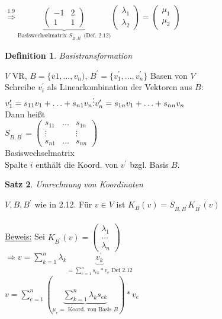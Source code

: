 \documentclass[a4paper,11pt]{article}
\newtheorem{definition}{Definition}[section]
\newtheorem{satz}[definition]{Satz}
\begin{document}
\\
$\overset{1.9}{\Rightarrow}\underbrace{\begin{pmatrix}-1&2\\1&1\end{pmatrix}}_{\text{Basiswechselmatrix }S_{B,B^\prime}\text{ (Def. 2.12)}}\begin{pmatrix}\lambda_1\\\lambda_2\end{pmatrix}=\begin{pmatrix}\mu_1\\\mu_2\end{pmatrix}$

\newpage

\begin{definition}
	Basistransformation
\end{definition}
$V$ VR, $B=\{v1,...,v_n)$, $B^\prime=\{v^\prime_1,...,v^\prime_n\}$ Basen von $V$ \\
Schreibe $v^\prime_i$ als Linearkombination der Vektoren aus $B$: \\
$v^\prime_1=s_{11}v_1+\hdots+s_{n1}v_n \\
\vdots \\
v^\prime_n=s_{1n}v_1+\hdots+s_{nn}v_n$ \\
Dann heißt \\
$S_{B,B^\prime}=\begin{pmatrix}s_{11} & \hdots & s_{1n} \\ \vdots & & \vdots \\ s_{n1} & \hdots & s_{nn}\end{pmatrix}$ \\
Basiswechselmatrix \\
Spalte $i$ enthält die Koord. von $v^\prime$ bzgl. Basis $B$.

\begin{satz}
	Umrechnung von Koordinaten
\end{satz}
$V,B,B^\prime$ wie in 2.12. Für $v\in V$ ist $K_B(v)=S_{B,B^\prime}K_{B^\prime}(v)$ \\
\\
\underline{Beweis:}
Sei $K_{B^\prime}(v)=\begin{pmatrix}\lambda_1 \\ \hdots \\ \lambda_n\end{pmatrix}$ \\
$\Rightarrow v=\sum^n_{k=1}\lambda_k\underbrace{v^\prime_k}_{=\sum^n_{e=1}s_{ek}*v_e\text{ Def 2.12}}$ \\
$v=\sum^n_{e=1}(\underbrace{\sum^n_{k=1}\lambda_ks_{ek}}_{\mu_e=\text{ Koord. von Basis }B})*v_e$
\end{document}
